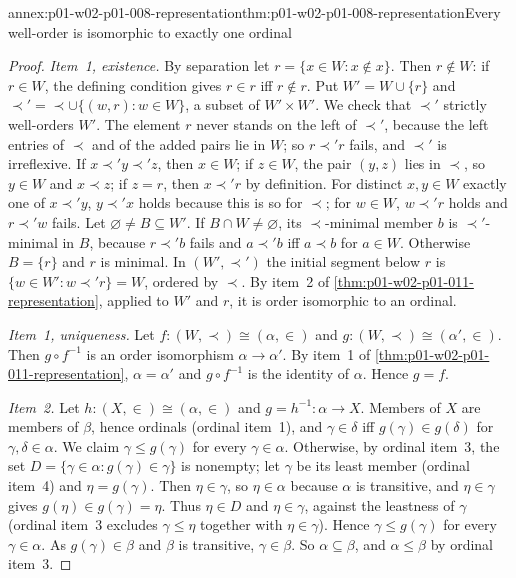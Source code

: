 \begin{annexitem}{annex:p01-w02-p01-008-representation}{thm:p01-w02-p01-008-representation}{Every well-order is isomorphic to exactly one ordinal}
\begin{proof}
\emph{Item~1, existence.} By separation let \(r=\{x\in W:x\notin x\}\).
Then \(r\notin W\): if \(r\in W\), the defining condition gives \(r\in r\)
iff \(r\notin r\). Put \(W'=W\cup\{r\}\) and
\(\prec'=\prec\cup\{(w,r):w\in W\}\), a subset of \(W'\times W'\). We check
that \(\prec'\) strictly well-orders \(W'\). The element \(r\) never stands
on the left of \(\prec'\), because the left entries of \(\prec\) and of the
added pairs lie in \(W\); so \(r\prec'r\) fails, and \(\prec'\) is
irreflexive. If \(x\prec'y\prec'z\), then \(x\in W\); if \(z\in W\), the
pair \((y,z)\) lies in \(\prec\), so \(y\in W\) and \(x\prec z\); if
\(z=r\), then \(x\prec'r\) by definition. For distinct \(x,y\in W\) exactly
one of \(x\prec'y\), \(y\prec'x\) holds because this is so for \(\prec\); for
\(w\in W\), \(w\prec'r\) holds and \(r\prec'w\) fails. Let
\(\varnothing\neq B\subseteq W'\). If \(B\cap W\neq\varnothing\), its
\(\prec\)-minimal member \(b\) is \(\prec'\)-minimal in \(B\), because
\(r\prec'b\) fails and \(a\prec'b\) iff \(a\prec b\) for \(a\in W\).
Otherwise \(B=\{r\}\) and \(r\) is minimal. In \((W',\prec')\) the initial
segment below \(r\) is \(\{w\in W':w\prec'r\}=W\), ordered by \(\prec\). By
item~2 of \cref{thm:p01-w02-p01-011-representation}, applied to \(W'\) and
\(r\), it is order isomorphic to an ordinal.

\emph{Item~1, uniqueness.} Let \(f:(W,\prec)\cong(\alpha,\in)\) and
\(g:(W,\prec)\cong(\alpha',\in)\). Then \(g\circ f^{-1}\) is an order
isomorphism \(\alpha\to\alpha'\). By item~1 of
\cref{thm:p01-w02-p01-011-representation}, \(\alpha=\alpha'\) and
\(g\circ f^{-1}\) is the identity of \(\alpha\). Hence \(g=f\).

\emph{Item~2.} Let \(h:(X,\in)\cong(\alpha,\in)\) and
\(g=h^{-1}:\alpha\to X\). Members of \(X\) are members of \(\beta\), hence
ordinals (ordinal item~1), and \(\gamma\in\delta\) iff
\(g(\gamma)\in g(\delta)\) for \(\gamma,\delta\in\alpha\). We claim
\(\gamma\leq g(\gamma)\) for every \(\gamma\in\alpha\). Otherwise, by
ordinal item~3, the set \(D=\{\gamma\in\alpha:g(\gamma)\in\gamma\}\) is
nonempty; let \(\gamma\) be its least member (ordinal item~4) and
\(\eta=g(\gamma)\). Then \(\eta\in\gamma\), so \(\eta\in\alpha\) because
\(\alpha\) is transitive, and \(\eta\in\gamma\) gives
\(g(\eta)\in g(\gamma)=\eta\). Thus \(\eta\in D\) and \(\eta\in\gamma\),
against the leastness of \(\gamma\) (ordinal item~3 excludes
\(\gamma\leq\eta\) together with \(\eta\in\gamma\)). Hence
\(\gamma\leq g(\gamma)\) for every \(\gamma\in\alpha\). As
\(g(\gamma)\in\beta\) and \(\beta\) is transitive, \(\gamma\in\beta\). So
\(\alpha\subseteq\beta\), and \(\alpha\leq\beta\) by ordinal item~3.
\end{proof}
\end{annexitem}

